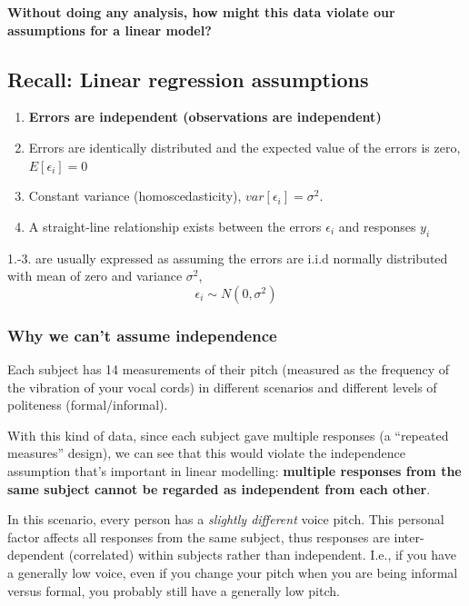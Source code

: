 \documentclass[
  openany]{book}
\providecommand{\tightlist}{%
  \setlength{\itemsep}{0pt}\setlength{\parskip}{0pt}}
\begin{document}
\textbf{Without doing any analysis, how might this data violate our assumptions for a linear model?}

\hypertarget{recall-linear-regression-assumptions}{%
\subsection{Recall: Linear regression assumptions}\label{recall-linear-regression-assumptions}}

\begin{enumerate}
\def\labelenumi{\arabic{enumi}.}
\tightlist
\item
  \textbf{Errors are independent (observations are independent)}
\item
  Errors are identically distributed and the expected value of the errors is zero, \(E[\epsilon_i]=0\)
\item
  Constant variance (homoscedasticity), \(var[\epsilon_i] = \sigma^2\).
\item
  A straight-line relationship exists between the errors \(\epsilon_i\) and responses \(y_i\)
\end{enumerate}

1.-3. are usually expressed as assuming the errors are i.i.d normally distributed with mean of zero and variance \(\sigma^2\),
\[\epsilon_i \sim N(0, \sigma^2)\]

\hypertarget{why-we-cant-assume-independence}{%
\subsubsection{Why we can't assume independence}\label{why-we-cant-assume-independence}}

Each subject has 14 measurements of their pitch (measured as the frequency of the vibration of your vocal cords) in different scenarios and different levels of politeness (formal/informal).

With this kind of data, since each subject gave multiple responses (a ``repeated measures'' design), we can see that this would violate the independence assumption that's important in linear modelling: \textbf{multiple responses from the same subject cannot be regarded as independent from each other}.

In this scenario, every person has a \emph{slightly different} voice pitch. This personal factor affects all responses from the same subject, thus responses are inter-dependent (correlated) within subjects rather than independent. I.e., if you have a generally low voice, even if you change your pitch when you are being informal versus formal, you probably still have a generally low pitch.
\end{document}
